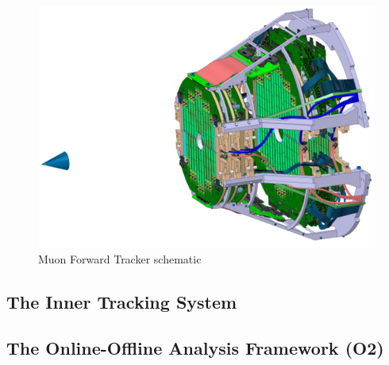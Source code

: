 \documentclass[11pt]{article}
\numberwithin{equation}{section}
\numberwithin{figure}{section}
\numberwithin{table}{section}
\begin{document}
\begin{figure}[h]
    \begin{center}
        \includegraphics[width=.8\textwidth]{Figs/MFT_schematic.jpg}
        \caption{Muon Forward Tracker schematic \cite{MFT_Schematic}}
        \label{fig:MFT Schematic}
    \end{center}
\end{figure}

\subsection{The Inner Tracking System}




\subsection{The Online-Offline Analysis Framework (O2)}




\printbibliography
\end{document}
